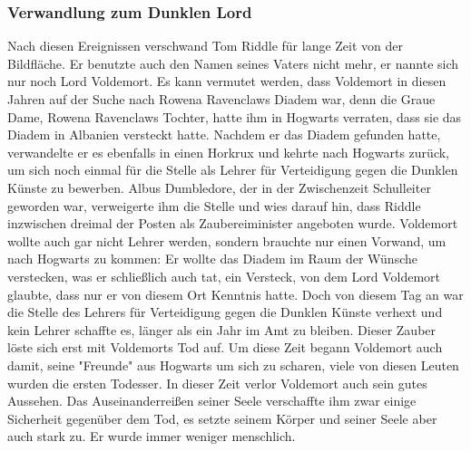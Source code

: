 \documentclass[a4paper, 10pt]{article}
\begin{document}
\subsubsection*{\large Verwandlung zum Dunklen Lord}
Nach diesen Ereignissen verschwand Tom Riddle für lange Zeit von der Bildfläche. Er benutzte auch den Namen seines Vaters nicht mehr, er nannte sich nur noch Lord Voldemort. Es kann vermutet werden, dass Voldemort in diesen Jahren auf der Suche nach Rowena Ravenclaws Diadem war, denn die Graue Dame, Rowena Ravenclaws Tochter, hatte ihm in Hogwarts verraten, dass sie das Diadem in Albanien versteckt hatte.
\vspace{10pt}
\newline
{}  
Nachdem er das Diadem gefunden hatte, verwandelte er es ebenfalls in einen Horkrux und kehrte nach Hogwarts zurück, um sich noch einmal für die Stelle als Lehrer für Verteidigung gegen die Dunklen Künste zu bewerben. Albus Dumbledore, der in der Zwischenzeit Schulleiter geworden war, verweigerte ihm die Stelle und wies darauf hin, dass Riddle inzwischen dreimal der Posten als Zaubereiminister angeboten wurde. Voldemort wollte auch gar nicht Lehrer werden, sondern brauchte nur einen Vorwand, um nach Hogwarts zu kommen: Er wollte das Diadem im Raum der Wünsche verstecken, was er schließlich auch tat, ein Versteck, von dem Lord Voldemort glaubte, dass nur er von diesem Ort Kenntnis hatte. Doch von diesem Tag an war die Stelle des Lehrers für Verteidigung gegen die Dunklen Künste verhext und kein Lehrer schaffte es, länger als ein Jahr im Amt zu bleiben. Dieser Zauber löste sich erst mit Voldemorts Tod auf.
\vspace{10pt}
\newline
{}  
Um diese Zeit begann Voldemort auch damit, seine "Freunde" aus Hogwarts um sich zu scharen, viele von diesen Leuten wurden die ersten Todesser.
\vspace{10pt}
\newline
{}  
In dieser Zeit verlor Voldemort auch sein gutes Aussehen. Das Auseinanderreißen seiner Seele verschaffte ihm zwar einige Sicherheit gegenüber dem Tod, es setzte seinem Körper und seiner Seele aber auch stark zu. Er wurde immer weniger menschlich.
\end{document}

